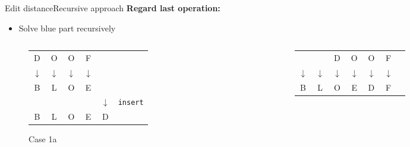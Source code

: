 
\begin{frame}{Edit distance}{Recursive approach}
  \textbf{Regard last operation:}
  \begin{itemize}
    \item
      Solve {\color{Mittel-Blau}blue} part recursively
  \end{itemize}
  \begin{columns}[T]
    \begin{column}{0.3\linewidth}
      \begin{figure}[!h]
        \begin{center}
          \begin{tabular}{c@{}c@{}c@{}c@{}c@{}l}
            \color{Mittel-Blau}D & \color{Mittel-Blau}O & \color{Mittel-Blau}O &
            \color{Mittel-Blau}F\\
            \color{Mittel-Blau}$\downarrow$ & \color{Mittel-Blau}$\downarrow$ &
            \color{Mittel-Blau}$\downarrow$ & \color{Mittel-Blau}$\downarrow$\\
            \color{Mittel-Blau}B & \color{Mittel-Blau}L & \color{Mittel-Blau}O &
            \color{Mittel-Blau}E\\
            {} & {} & {} & {} & $\downarrow$ & \texttt{insert}\\
            B & L & O & E & D
          \end{tabular}
        \end{center}
        \caption{Case 1a}
      \end{figure}
    \end{column}
    \begin{column}{0.3\linewidth}
      \begin{figure}[!h]
        \begin{center}
          \begin{tabular}{c@{}c@{}c@{}c@{}c@{}c@{}l}
            {} & {} & \color{Mittel-Blau}D & \color{Mittel-Blau}O &
            \color{Mittel-Blau}O & \color{Mittel-Blau}F\\
            \color{Mittel-Blau}$\downarrow$ & \color{Mittel-Blau}$\downarrow$ &
            \color{Mittel-Blau}$\downarrow$ & \color{Mittel-Blau}$\downarrow$ &
            \color{Mittel-Blau}$\downarrow$ & \color{Mittel-Blau}$\downarrow$\\
            \color{Mittel-Blau}B & \color{Mittel-Blau}L & \color{Mittel-Blau}O &
            \color{Mittel-Blau}E & \color{Mittel-Blau}D & \color{Mittel-Blau}F\\

\end{tabular}
\end{center}
\end{figure}
\end{column}
\end{columns}
\end{frame}
